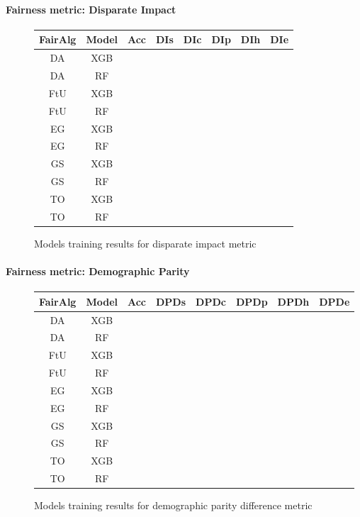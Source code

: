 \paragraph{Fairness metric: Disparate Impact}

\begin{figure}[H]
    \centering
    \begin{tabular}{|c|c|c|c|c|c|c|c|}
        \hline
        \textbf{FairAlg} & \textbf{Model} & \textbf{Acc} & \textbf{DIs} & \textbf{DIc} & \textbf{DIp} & \textbf{DIh} & \textbf{DIe} \\
        \hline
        DA & XGB & &  &  & & & \\
        DA & RF & &  &  & & & \\
        FtU & XGB & &  &  & & & \\
        FtU & RF & &  &  & & & \\
        EG & XGB & &  &  & & & \\
        EG & RF & &  &  & & & \\
        GS & XGB & &  &  & & & \\
        GS & RF & &  &  & & &\\
        TO & XGB & &  &  & & & \\
        TO & RF & &  &  & & & \\
        \hline
    \end{tabular}
    \caption{Models training results for disparate impact metric}
    \label{fig:results}
\end{figure}

\paragraph{Fairness metric: Demographic Parity}

\begin{figure}[H]
    \centering
    \begin{tabular}{|c|c|c|c|c|c|c|c|}
        \hline
        \textbf{FairAlg} & \textbf{Model} & \textbf{Acc} & \textbf{DPDs} & \textbf{DPDc} & \textbf{DPDp} & \textbf{DPDh} & \textbf{DPDe} \\
        \hline
        DA & XGB & &  &  & & & \\
        DA & RF & &  &  & & & \\
        FtU & XGB & &  &  & & & \\
        FtU & RF & &  &  & & & \\
        EG & XGB & &  &  & & & \\
        EG & RF & &  &  & & & \\
        GS & XGB & &  &  & & & \\
        GS & RF & &  &  & & &\\
        TO & XGB & &  &  & & & \\
        TO & RF & &  &  & & & \\
        \hline
    \end{tabular}
    \caption{Models training results for demographic parity difference metric}
    \label{fig:results}
\end{figure}